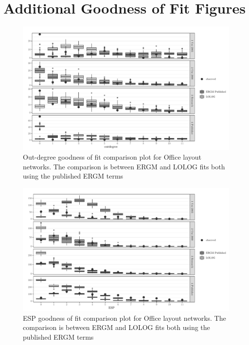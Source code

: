 \documentclass[
]{statsoc}
\begin{document}
\appendix
\appendixpage
\addappheadtotoc

\section{Additional Goodness of Fit Figures}\label{app:GOF}

\begin{figure}[H]

{\centering \includegraphics{ERGM_and_LOLOG_performance_real_world_files/figure-latex/unnamed-chunk-9-1} 

}

\caption{\label{fig:sailer_gof_pub_odeg}Out-degree goodness of fit comparison plot for Office layout networks. The comparison is between ERGM and LOLOG fits both using the published ERGM terms}\label{fig:unnamed-chunk-9}
\end{figure}

\begin{figure}[H]

{\centering \includegraphics{ERGM_and_LOLOG_performance_real_world_files/figure-latex/unnamed-chunk-10-1} 

}

\caption{\label{fig:sailer_gof_pub_esp} ESP goodness of fit comparison plot for Office layout networks. The comparison is between ERGM and LOLOG fits both using the published ERGM terms}\label{fig:unnamed-chunk-10}
\end{figure}
\end{document}
